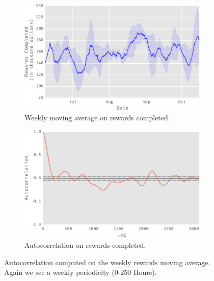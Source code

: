 \begin{figure}[tb]
    \centering
    \begin{subfigure}[b]{0.48\textwidth}
        \centering
        \includegraphics[width=\textwidth]{figures/mac}
        \caption{Weekly moving average on rewards completed.}
        \label{fig:mac}
    \end{subfigure}
    \hfill
    \begin{subfigure}[b]{0.48\textwidth}
        \centering
        \includegraphics[width=\textwidth]{figures/macac}
        \caption{Autocorrelation on rewards completed.}
        \label{fig:macac}
    \end{subfigure}
    \hfill
	\caption{Autocorrelation computed on the weekly rewards moving average. Again we see a weekly periodicity (0-250 Hours).}
	\label{fig:autocorrelation2}
\end{figure}